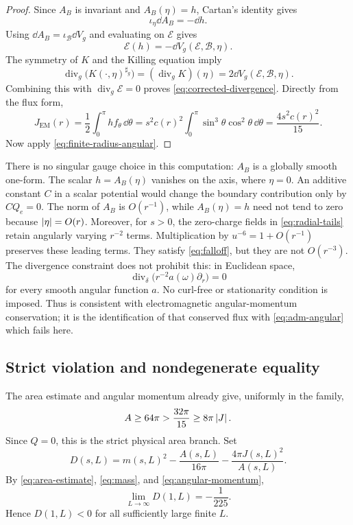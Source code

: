 \begin{proof}
Since \(A_B\) is invariant and \(A_B(\eta)=h\), Cartan's identity gives
\[
 \iota_\eta\dd A_B=-\dd h.
\]
Using \(\dd A_B=\iota_{\mathcal B}\dd V_g\) and evaluating on
\(\mathcal E\) gives
\[
 \mathcal E(h)=-\dd V_g(\mathcal E,\mathcal B,\eta).
\]
The symmetry of \(K\) and the Killing equation imply
\[
 \operatorname{div}_g\bigl(K(\cdot,\eta)^{\sharp_g}\bigr)
   =(\operatorname{div}_gK)(\eta)
   =2\dd V_g(\mathcal E,\mathcal B,\eta).
\]
Combining this with \(\operatorname{div}_g\mathcal E=0\) proves
\eqref{eq:corrected-divergence}. Directly from the flux form,
\[
 J_{\mathrm{EM}}(r)
  =\frac12\int_0^\pi h f_\theta\,\dd\theta
  =s^2c(r)^2\int_0^\pi\sin^3\theta\cos^2\theta\,\dd\theta
  =\frac{4s^2c(r)^2}{15}.
\]
Now apply \eqref{eq:finite-radius-angular}.
\end{proof}

There is no singular gauge choice in this computation: \(A_B\) is a
globally smooth one-form. The scalar \(h=A_B(\eta)\) vanishes on the
axis, where \(\eta=0\). An additive constant \(C\) in a scalar potential
would change the boundary contribution only by \(C Q_e=0\).
The norm of \(A_B\) is \(O(r^{-1})\), while
\(A_B(\eta)=h\) need not tend to zero because \(\left\lvert\eta\right\rvert=O(r)\).
Moreover, for \(s>0\), the zero-charge fields in \eqref{eq:radial-tails} retain
angularly varying \(r^{-2}\) terms. Multiplication by
\(u^{-6}=1+O(r^{-1})\) preserves these leading terms. They satisfy
\eqref{eq:falloff}, but they are not \(O(r^{-3})\).
The divergence constraint does not prohibit this: in Euclidean space,
\[
 \operatorname{div}_\delta\bigl(r^{-2}a(\omega)\partial_r\bigr)=0
\]
for every smooth angular function \(a\). No curl-free or stationarity
condition is imposed. Thus  is consistent with
electromagnetic angular-momentum conservation; it is the identification
of that conserved flux with \eqref{eq:adm-angular} which fails here.

\subsection{Strict violation and nondegenerate equality}

The area estimate and angular momentum already give, uniformly in the
family,
\begin{equation}\label{eq:strict-branch}
 A\ge64\pi>\frac{32\pi}{15}\ge8\pi\left\lvert J\right\rvert.
\end{equation}
Since \(Q=0\), this is the strict physical area branch. Set
\begin{equation}\label{eq:defect}
 D(s,L)=m(s,L)^2-\frac{A(s,L)}{16\pi}
                         -\frac{4\pi J(s,L)^2}{A(s,L)}.
\end{equation}
By \eqref{eq:area-estimate}, \eqref{eq:mass}, and
\eqref{eq:angular-momentum},
\begin{equation}\label{eq:negative-limit}
 \lim_{L\to\infty}D(1,L)=-\frac1{225}.
\end{equation}
Hence \(D(1,L)<0\) for all sufficiently large finite \(L\).

